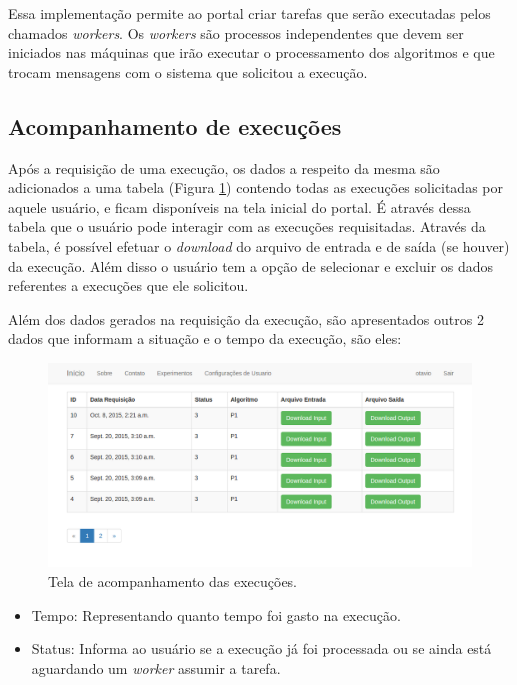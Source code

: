 \documentclass[tg]{mdtufsm}
\begin{document}
Essa implementação permite ao portal criar tarefas que serão executadas pelos chamados \emph{workers}. Os \emph{workers} são processos independentes que devem ser iniciados nas máquinas que irão executar o processamento dos algoritmos e que trocam mensagens com o sistema que solicitou a execução.


\subsection{Acompanhamento de execuções}



Após a requisição de uma execução, os dados a respeito da mesma são adicionados a uma tabela (Figura \ref{fig:funcional}) contendo todas as execuções solicitadas por aquele usuário, e ficam disponíveis na tela inicial do portal. É através dessa tabela que o usuário pode interagir com as execuções requisitadas. Através da tabela, é possível efetuar o \emph{download} do arquivo de entrada e de saída (se houver) da execução. Além disso o usuário tem a opção de selecionar e excluir os dados referentes a execuções que ele solicitou.

Além dos dados gerados na requisição da execução, são apresentados outros 2 dados que informam a situação e o tempo da execução, são eles:
\begin{figure}
	\centering
	\includegraphics[width=1\textwidth]{userhome}
	\caption{
		Tela de acompanhamento das execuções.
	}
	\label{fig:funcional}
\end{figure}
\begin{itemize}
	\item Tempo: Representando quanto tempo foi gasto na execução.
	\item Status: Informa ao usuário se a execução já foi processada ou se ainda está aguardando um \emph{worker} assumir a tarefa.
\end{itemize}
\end{document}
